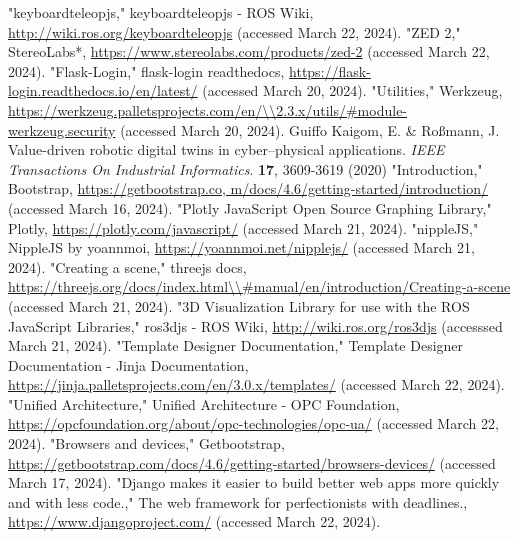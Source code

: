 \documentclass[conference]{IEEEtran}
\begin{document}
\begin{thebibliography}{00}
"keyboardteleopjs," keyboardteleopjs - ROS Wiki, \url{http://wiki.ros.org/keyboardteleopjs} (accessed March 22, 2024).
"ZED 2," StereoLabs*, \url{https://www.stereolabs.com/products/zed-2} (accessed March 22, 2024).
"Flask-Login," flask-login readthedocs, \url{https://flask-login.readthedocs.io/en/latest/} (accessed March 20, 2024).
"Utilities," Werkzeug, \url{https://werkzeug.palletsprojects.com/en/\\2.3.x/utils/\#module-werkzeug.security} (accessed March 20, 2024).
Guiffo Kaigom, E. \& Roßmann, J. Value-driven robotic digital twins in cyber–physical applications. {\em IEEE Transactions On Industrial Informatics}. \textbf{17}, 3609-3619 (2020)
"Introduction," Bootstrap, \url{https://getbootstrap.co, m/docs/4.6/getting-started/introduction/} (accessed March 16, 2024).
"Plotly JavaScript Open Source Graphing Library," Plotly, \url{https://plotly.com/javascript/} (accessed March 21, 2024).
"nippleJS," NippleJS by yoannmoi, \url{https://yoannmoi.net/nipplejs/} (accessed March 21, 2024).
"Creating a scene," threejs docs, \url{https://threejs.org/docs/index.html\\\#manual/en/introduction/Creating-a-scene} (accessed March 21, 2024).
"3D Visualization Library for use with the ROS JavaScript Libraries," ros3djs - ROS Wiki, \url{http://wiki.ros.org/ros3djs} (accesssed March 21, 2024).
"Template Designer Documentation," Template Designer Documentation - Jinja Documentation, \url{https://jinja.palletsprojects.com/en/3.0.x/templates/} (accessed March 22, 2024).
"Unified Architecture," Unified Architecture - OPC Foundation, \url{https://opcfoundation.org/about/opc-technologies/opc-ua/} (accessed March 22, 2024).
"Browsers and devices," Getbootstrap, \url{https://getbootstrap.com/docs/4.6/getting-started/browsers-devices/} (accessed March 17, 2024).
"Django makes it easier to build better web apps more quickly and with less code.," The web framework for perfectionists with deadlines., \url{https://www.djangoproject.com/} (accessed March 22, 2024).
\end{thebibliography}
\vspace{12pt}
\end{document}
